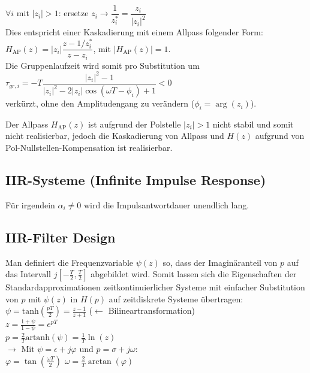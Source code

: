 \documentclass[a4paper,landscape,6pt]{article}
\begin{document}
\begin{multicols}{3}
$\forall i$ mit $|z_i| > 1$: ersetze $z_i \rightarrow \dfrac{1}{z_i^*} = \dfrac{z_i}{|z_i|^2}$\\

Dies entspricht einer Kaskadierung mit einem Allpass folgender Form:\\
$H_{\text{AP}}(z) = |z_i|\dfrac{z-1/z_i^*}{z-z_i}$, mit $|H_{\text{AP}}(z)| = 1$.\\

Die Gruppenlaufzeit wird somit pro Substitution um \\

$\tau_{gr,i} = -T\dfrac{|z_i|^2 - 1}{|z_i|^2 - 2|z_i|\cos(\omega T-\phi_i) + 1} < 0$ \\

verkürzt, ohne den Amplitudengang zu verändern ($\phi_i = \arg(z_i)$).

Der Allpass $H_{\text{AP}}(z)$ ist aufgrund der Polstelle $|z_i| > 1$ nicht stabil und somit nicht realisierbar, jedoch die Kaskadierung von Allpass und $H(z)$ aufgrund von Pol-Nullstellen-Kompensation ist realisierbar.

\subsection*{IIR-Systeme \footnotesize{(Infinite Impulse Response)}}
Für irgendein $\alpha_i \neq 0$ wird die Impulsantwortdauer unendlich lang.
\subsection*{IIR-Filter Design}
Man definiert die Frequenzvariable $\psi(z)$ so, dass der Imaginäranteil von $p$ auf das Intervall $j[-\frac{T}{2}, \frac{T}{2}]$ abgebildet wird. Somit lassen sich die Eigenschaften der Standardapproximationen zeitkontinuierlicher Systeme mit einfacher Substitution von $p$ mit $\psi(z)$ in $H(p)$ auf zeitdiskrete Systeme übertragen:\\

$\psi = \text{tanh}(\frac{pT}{2}) = \frac{z-1}{z+1}$ \tab ($\leftarrow$ Bilineartransformation)\\

$z = \frac{1+\psi}{1-\psi} = e^{pT}$\\

$p = \frac{2}{T}\text{artanh}(\psi) = \frac{1}{T}\ln(z)$\\

$\rightarrow$ Mit $\psi= \epsilon + j\varphi$ und $p = \sigma + j\omega$:\\
$\varphi = \tan(\frac{\omega T}{2})$ \tab $\omega = \frac{2}{T}\arctan(\varphi)$\\


\end{multicols}
\end{document}
